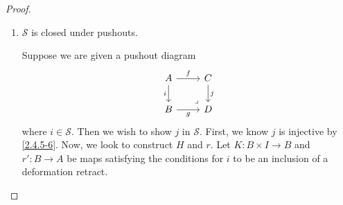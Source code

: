 \documentclass{amsart}
\theoremstyle{plain}
\theoremstyle{definition}
\newcommand{\0}{\mathbf{0}}
\newcommand{\cS}{\mathcal S}
\renewcommand{\(}{\left(}
\renewcommand{\)}{\right)}
\begin{document}
\begin{proof}
\begin{enumerate}[listparindent=\parindent,parsep=0pt]
    \item $\cS$ is closed under pushouts.
    
    Suppose we are given a pushout diagram
    \[\begin{tikzcd}
      A & C \\
      B & D
      \arrow["i"', from=1-1, to=2-1]
      \arrow["g"', from=2-1, to=2-2]
      \arrow["f", from=1-1, to=1-2]
      \arrow["j", from=1-2, to=2-2]
      \arrow["\ulcorner"{anchor=center, pos=0.125, rotate=180}, draw=none, from=2-2, to=1-1]
    \end{tikzcd}\]
    where $i\in\cS$. Then we wish to show $j$ in $\cS$. First, we know $j$ is injective by \autoref{2.4.5-6}. Now, we look to construct $H$ and $r$. Let $K:B\times I\to B$ and $r':B\to A$ be maps satisfying the conditions for $i$ to be an inclusion of a deformation retract.


\end{enumerate}
\end{proof}
\end{document}
